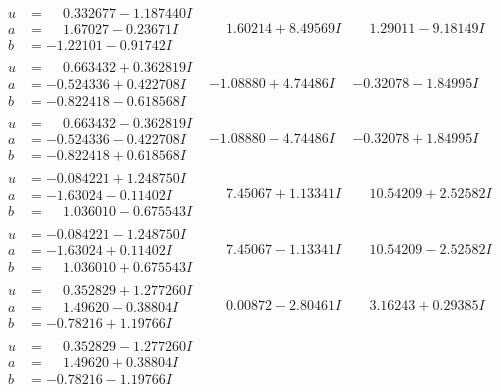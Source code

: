 \documentclass[1p]{elsarticle_modified}
\theoremstyle{definition}
\begin{document}
$$\begin{array}{c|c|c}
\begin{aligned}
u &= \phantom{-}0.332677 - 1.187440 I \\
a &= \phantom{-}1.67027 - 0.23671 I \\
b &= -1.22101 - 0.91742 I\end{aligned}
 & \phantom{-}1.60214 + 8.49569 I & \phantom{-}1.29011 - 9.18149 I \\ \hline\begin{aligned}
u &= \phantom{-}0.663432 + 0.362819 I \\
a &= -0.524336 + 0.422708 I \\
b &= -0.822418 - 0.618568 I\end{aligned}
 & -1.08880 + 4.74486 I & -0.32078 - 1.84995 I \\ \hline\begin{aligned}
u &= \phantom{-}0.663432 - 0.362819 I \\
a &= -0.524336 - 0.422708 I \\
b &= -0.822418 + 0.618568 I\end{aligned}
 & -1.08880 - 4.74486 I & -0.32078 + 1.84995 I \\ \hline\begin{aligned}
u &= -0.084221 + 1.248750 I \\
a &= -1.63024 - 0.11402 I \\
b &= \phantom{-}1.036010 - 0.675543 I\end{aligned}
 & \phantom{-}7.45067 + 1.13341 I & \phantom{-}10.54209 + 2.52582 I \\ \hline\begin{aligned}
u &= -0.084221 - 1.248750 I \\
a &= -1.63024 + 0.11402 I \\
b &= \phantom{-}1.036010 + 0.675543 I\end{aligned}
 & \phantom{-}7.45067 - 1.13341 I & \phantom{-}10.54209 - 2.52582 I \\ \hline\begin{aligned}
u &= \phantom{-}0.352829 + 1.277260 I \\
a &= \phantom{-}1.49620 - 0.38804 I \\
b &= -0.78216 + 1.19766 I\end{aligned}
 & \phantom{-}0.00872 - 2.80461 I & \phantom{-}3.16243 + 0.29385 I \\ \hline\begin{aligned}
u &= \phantom{-}0.352829 - 1.277260 I \\
a &= \phantom{-}1.49620 + 0.38804 I \\
b &= -0.78216 - 1.19766 I\end{aligned}

\end{array}$$
\end{document}
